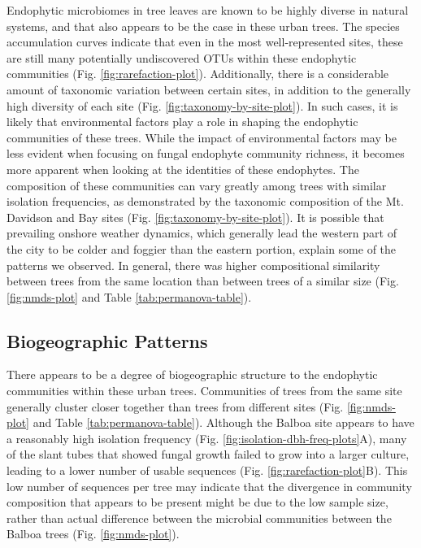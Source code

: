 \documentclass[fleqn,10pt,lineno]{wlpeerj} %
\begin{document}
Endophytic microbiomes in tree leaves are known to be highly diverse in natural systems, and that also appears to be the case in these urban trees. The species accumulation curves indicate that even in the most well-represented sites, these are still many potentially undiscovered OTUs within these endophytic communities (Fig. \ref{fig:rarefaction-plot}). Additionally, there is a considerable amount of taxonomic variation between certain sites, in addition to the generally high diversity of each site (Fig. \ref{fig:taxonomy-by-site-plot}). In such cases, it is likely that environmental factors play a role in shaping the endophytic communities of these trees. While the impact of environmental factors may be less evident when focusing on fungal endophyte community richness, it becomes more apparent when looking at the identities of these endophytes. The composition of these communities can vary greatly among trees with similar isolation frequencies, as demonstrated by the taxonomic composition of the Mt. Davidson and Bay sites (Fig. \ref{fig:taxonomy-by-site-plot}). It is possible that prevailing onshore weather dynamics, which generally lead the western part of the city to be colder and foggier than the eastern portion, explain some of the patterns we observed. In general, there was higher compositional similarity between trees from the same location than between trees of a similar size (Fig. \ref{fig:nmds-plot} and Table \ref{tab:permanova-table}).

\hypertarget{biogeographic-patterns-1}{%
\subsection*{Biogeographic Patterns}\label{biogeographic-patterns-1}}

There appears to be a degree of biogeographic structure to the endophytic communities within these urban trees. Communities of trees from the same site generally cluster closer together than trees from different sites (Fig. \ref{fig:nmds-plot} and Table \ref{tab:permanova-table}). Although the Balboa site appears to have a reasonably high isolation frequency (Fig. \ref{fig:isolation-dbh-freq-plots}A), many of the slant tubes that showed fungal growth failed to grow into a larger culture, leading to a lower number of usable sequences (Fig. \ref{fig:rarefaction-plot}B). This low number of sequences per tree may indicate that the divergence in community composition that appears to be present might be due to the low sample size, rather than actual difference between the microbial communities between the Balboa trees (Fig. \ref{fig:nmds-plot}).
\end{document}
